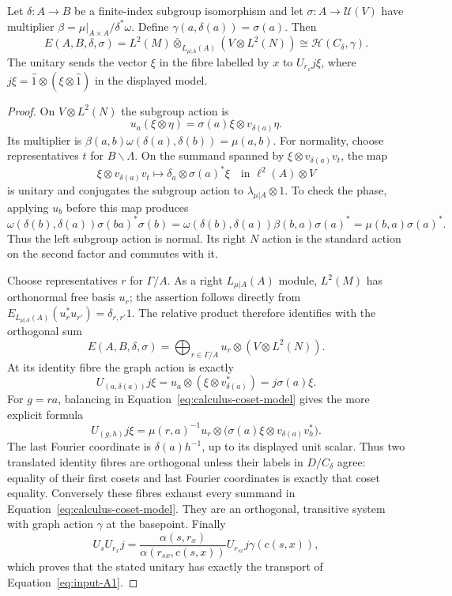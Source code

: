 \begin{lemma}
\label{lem:calculus-graph-model}
Let $\delta:A\to B$ be a finite-index subgroup isomorphism and let
$\sigma:A\to\mathcal U(V)$ have multiplier
$\beta=\mu|_{A\times A}/\delta^*\omega$.  Define
$\gamma(a,\delta(a))=\sigma(a)$.  Then
\[
 E(A,B,\delta,\sigma)=
 L^2(M)\mathbin{\bar\otimes}_{L_{\mu|A}(A)}
       (V\otimes L^2(N))
 \cong\mathcal H(C_\delta,\gamma).
\]
The unitary sends the vector $\xi$ in the fibre labelled by $x$ to
$U_{r_x}j\xi$, where
$j\xi=\widehat1\otimes(\xi\otimes\widehat1)$ in the displayed model.
\end{lemma}

\begin{proof}
On $V\otimes L^2(N)$ the subgroup action is
\[
 u_a(\xi\otimes\eta)=\sigma(a)\xi\otimes v_{\delta(a)}\eta.
\]
Its multiplier is $\beta(a,b)\omega(\delta(a),\delta(b))=\mu(a,b)$.
For normality, choose representatives $t$ for $B\backslash\Lambda$.
On the summand spanned by $\xi\otimes v_{\delta(a)}v_t$, the map
\begin{equation}\label{eq:calculus-absorption}
 \xi\otimes v_{\delta(a)}v_t
 \longmapsto\delta_a\otimes\sigma(a)^*\xi
 \quad\text{in }\ell^2(A)\otimes V
\end{equation}
is unitary and conjugates the subgroup action to
$\lambda_{\mu|A}\otimes1$.  To check the phase, applying $u_b$
before this map produces
\[
 \omega(\delta(b),\delta(a))
 \sigma(ba)^*\sigma(b)
 =\omega(\delta(b),\delta(a))\beta(b,a)\sigma(a)^*
 =\mu(b,a)\sigma(a)^*.
\]
Thus the left subgroup action is normal.  Its right $N$ action is
the standard action on the second factor and commutes with it.

Choose representatives $r$ for $\Gamma/A$.  As a right
$L_{\mu|A}(A)$ module, $L^2(M)$ has orthonormal free basis $u_r$;
the assertion follows directly from
$E_{L_{\mu|A}(A)}(u_r^*u_{r'})=\delta_{r,r'}1$.
The relative product therefore identifies with the orthogonal sum
\begin{equation}\label{eq:calculus-coset-model}
 E(A,B,\delta,\sigma)
 =\bigoplus_{r\in\Gamma/A}u_r\otimes(V\otimes L^2(N)).
\end{equation}
At its identity fibre the graph action is exactly
\[
 U_{(a,\delta(a))}j\xi
 =u_a\otimes(\xi\otimes v_{\delta(a)}^*)
 =j\sigma(a)\xi.
\]
For $g=ra$, balancing in Equation~\eqref{eq:calculus-coset-model}
gives the more explicit formula
\[
 U_{(g,h)}j\xi
 =\mu(r,a)^{-1}u_r\otimes
       \bigl(\sigma(a)\xi\otimes v_{\delta(a)}v_h^*\bigr).
\]
The last Fourier coordinate is $\delta(a)h^{-1}$, up to its displayed
unit scalar.  Thus two translated identity fibres are orthogonal
unless their labels in $D/C_\delta$ agree: equality of their first
cosets and last Fourier coordinates is exactly that coset equality.
Conversely these fibres exhaust every summand in
Equation~\eqref{eq:calculus-coset-model}.  They are an orthogonal,
transitive system with graph action $\gamma$ at the basepoint.
Finally
\[
 U_sU_{r_x}j
 =\frac{\alpha(s,r_x)}{\alpha(r_{sx},c(s,x))}
       U_{r_{sx}}j\gamma(c(s,x)),
\]
which proves that the stated unitary has exactly the transport
of Equation~\eqref{eq:input-A1}.
\end{proof}

